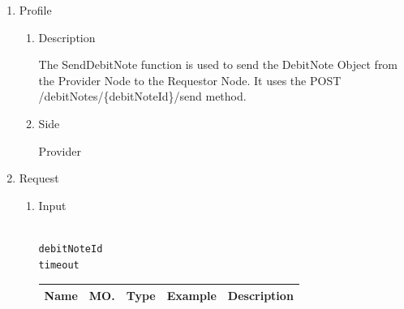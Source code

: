 \newpage



\begin{enumerate}

\item Profile

\begin{enumerate}

\item Description

The SendDebitNote function is used to send the DebitNote Object from the Provider Node to the Requestor Node. 
It uses the POST /debitNotes/\{debitNoteId\}/send method.

\item Side

Provider

\end{enumerate}

\item Request

\begin{enumerate}

\item Input

\begin{tcolorbox}[boxrule=0pt, frame empty]
\begin{verbatim}

debitNoteId
timeout

\end{verbatim}
\end{tcolorbox}





\begin{table}[H]
\footnotesize

\begin{center}
\begin{tabular}{|p{3cm}|l|p{3cm}|p{3cm}|p{4cm}|} 
\hline
\rowcolor{lightgray}	Name	& MO.	& Type	& Example & 	Description \\
\hline


\end{tabular}
\end{center}
\end{table}
\end{enumerate}
\end{enumerate}
